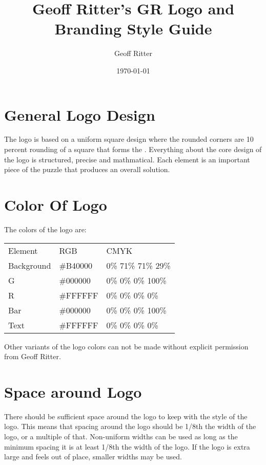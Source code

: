 \documentclass{logo_styleguide}
\author{Geoff Ritter}
\title{Geoff Ritter's GR Logo and Branding Style Guide}
\date{\today}
\begin{document}
\mytitle
\logodesign



\section{General Logo Design}
The logo is based on a uniform square design where the rounded corners are 10 percent rounding of a square that forms
the \gchar. Everything about the core design of the logo is structured, precise and mathmatical. Each element is an important
piece of the puzzle that produces an overall solution.



\section{Color Of Logo}
The colors of the logo are:

\begin{tabular}{lll}
    Element & RGB & CMYK\\
    Background & \#B40000 & 0\% 71\% 71\% 29\%\\
    G & \#000000 & 0\% 0\% 0\% 100\%\\
    R & \#FFFFFF & 0\% 0\% 0\% 0\%\\
    Bar & \#000000 & 0\% 0\% 0\% 100\%\\
    Text & \#FFFFFF & 0\% 0\% 0\% 0\%\\
\end{tabular}

Other variants of the logo colors can not be made without explicit permission from Geoff Ritter.



\section{Space around Logo}
There should be sufficient space around the logo to keep with the style of the logo. This means that spacing around the
logo should be 1/8th the width of the logo, or a multiple of that. Non-uniform widths can be used as long as the minimum
spacing it is at least 1/8th the width of the logo. If the logo is extra large and feels out of place, smaller widths
may be used.
\end{document}
